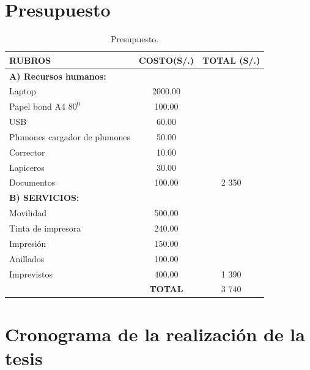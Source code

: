 \section{Presupuesto}


\begin{table}[htb]
\centering
\begin{tabular}{|p{7cm}|c|c|}
\hline
\textbf{RUBROS} & \textbf{COSTO(S/.)}& \textbf{TOTAL (S/.)} \\ \hline
\textbf{A) Recursos humanos:} & & \\
Laptop & 2000.00& \\
Papel bond A4 $80^0$ &100.00 & \\
USB &60.00&\\
Plumones cargador de plumones&50.00&\\
Corrector &10.00&\\
Lapiceros &30.00&\\
Documentos &100.00& 2 350\\ \hline
\textbf{B) SERVICIOS:} &&\\
Movilidad &500.00& \\
Tinta de impresora &240.00& \\
Impresión &150.00 &\\
Anillados &100.00&\\
Imprevistos &400.00& 1 390\\ \hline
& \textbf{TOTAL}& 3 740\\
 \hline
\end{tabular}
\caption{Presupuesto.}
\label{tabla:final2}
\end{table}



\section{Cronograma de la realización de la tesis}

